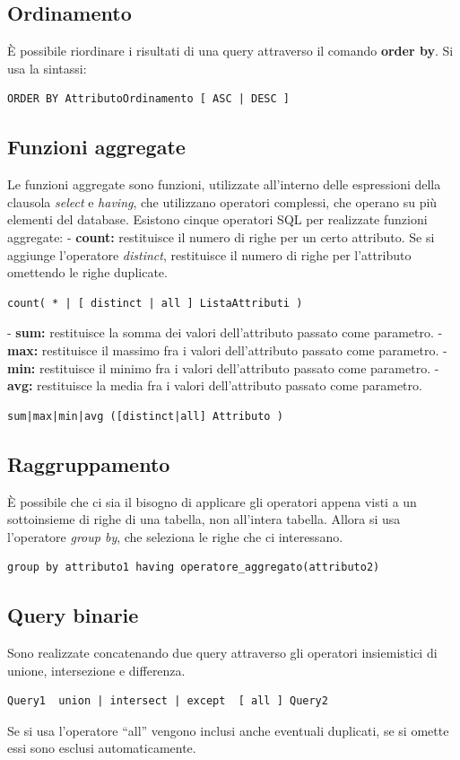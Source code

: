 \documentclass[\main/main.tex]{subfiles}
\begin{document}
\subsection{Ordinamento}
È possibile riordinare i risultati di una query attraverso il comando \textbf{order by}.
Si usa la sintassi:
\begin{verbatim}
ORDER BY AttributoOrdinamento [ ASC | DESC ]
\end{verbatim}

\subsection{Funzioni aggregate}
Le funzioni aggregate sono funzioni, utilizzate all'interno delle espressioni della clausola \textit{select} e \textit{having}, che utilizzano operatori complessi, che operano su più elementi del database.
Esistono cinque operatori SQL per realizzate funzioni aggregate:
- \textbf{count:} restituisce il numero di righe per un certo attributo. Se si aggiunge l'operatore \textit{distinct}, restituisce il numero di righe per l'attributo omettendo le righe duplicate.
\begin{verbatim}
count( * | [ distinct | all ] ListaAttributi )
\end{verbatim}
- \textbf{sum:} restituisce la somma dei valori dell'attributo passato come parametro.
- \textbf{max:} restituisce il massimo fra i valori dell'attributo passato come parametro.
- \textbf{min:} restituisce il minimo fra i valori dell'attributo passato come parametro.
- \textbf{avg:} restituisce la media fra i valori dell'attributo passato come parametro.
\begin{verbatim}
sum|max|min|avg ([distinct|all] Attributo )
\end{verbatim}

\subsection{Raggruppamento}
È possibile che ci sia il bisogno di applicare gli operatori appena visti a un sottoinsieme di righe di una tabella, non all'intera tabella.
Allora si usa l'operatore \textit{group by}, che seleziona le righe che ci interessano.
\begin{verbatim}
group by attributo1 having operatore_aggregato(attributo2)
\end{verbatim}

\subsection{Query binarie}
Sono realizzate concatenando due query attraverso gli operatori insiemistici di unione, intersezione e differenza.
\begin{verbatim}
Query1  union | intersect | except  [ all ] Query2
\end{verbatim}
Se si usa l'operatore ``all'' vengono inclusi anche eventuali duplicati, se si omette essi sono esclusi automaticamente.
\end{document}
